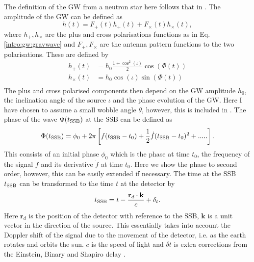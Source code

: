 The definition of the \gls{GW} from a neutron star here follows that in \citep{riles2017RecentSearches,schutz1998DataAnalysis,dupuis2005BayesianEstimation}. The amplitude of the \gls{GW} can be defined as
\begin{equation}
\label{intro:cw:ht}
h(t) = F_+(t)h_{+}(t) +F_{\times}(t)h_{\times}(t),
\end{equation}
where $h_{+},h_{\times}$ are the plus and cross polarisations functions as in Eq.\ref{intro:gw:gravwave} and $F_{+},F_{\times}$ are the antenna pattern functions to the two polarisations.
These are defined by
\begin{equation}
\label{intro:cw:amplitudes}
    \begin{split}
        h_{+}(t) &=  h_0 \frac{1 + \cos^2{(\iota)}}{2}\cos{\left(\Phi(t)\right)} \\
        h_{\times}(t) &= h_0  \cos{(\iota)} \sin{\left( \Phi(t)\right) } \\
    \end{split}
\end{equation}
The plus and cross polarised components then depend on the \gls{GW} amplitude $h_0$, the inclination angle of the source $\iota$ and the phase evolution of the \gls{GW}. Here I have chosen to assume a small wobble angle $\theta$, however, this is included in \citep{schutz1998DataAnalysis}. The phase of the wave $\Phi(t_{{\rm SSB}})$ at the \gls{SSB} can be defined as
\begin{equation}
\label{searchcw:model:phase}
    \Phi(t_{{\rm SSB}}) = \phi_0 + 2\pi\left[ f(t_{{\rm SSB}} - t_0) + \frac{1}{2} \dot{f} (t_{{\rm SSB}} - t_0)^2 + .....\right] .
\end{equation}
This consists of an initial phase $\phi_0$ which is the phase at time $t_0$, the frequency of the signal $f$ and its derivative ${\dot{f}}$ at time $t_0$. Here we show the phase to second order, however, this can be easily extended if necessary. 
The time at the \gls{SSB} $t_{{\rm SSB}}$ can be transformed to the time $t$ at the detector by
\begin{equation}
t_{{\rm SSB}} = t - \frac{\mathbf{r}_d \cdot \mathbf{k}}{c} + \delta_t.
\end{equation}
Here $\mathbf{r}_d$ is the position of the detector with reference to the \gls{SSB}, $\mathbf{k}$ is a unit vector in the direction of the source. This essentially takes into account the Doppler shift of the signal due to the movement of the detector, i.e. as the earth rotates and orbits the sun. $c$ is the speed of light and $\delta t$ is extra corrections from the Einstein, Binary and Shapiro delay \citep{}.
